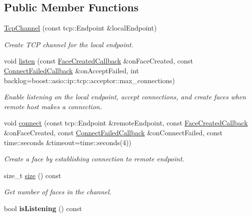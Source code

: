 \subsection*{Public Member Functions}
\begin{DoxyCompactItemize}
\item 
\hyperlink{classnfd_1_1TcpChannel_a3a7559bdecc4a76e08046ebc1f3c93c4}{Tcp\+Channel} (const tcp\+::\+Endpoint \&local\+Endpoint)
\begin{DoxyCompactList}\small\item\em Create T\+CP channel for the local endpoint. \end{DoxyCompactList}\item 
void \hyperlink{classnfd_1_1TcpChannel_ab2c06032e8775433fc01ce11937f7ca9}{listen} (const \hyperlink{classnfd_1_1Channel_a47f1a8874228ad9dfa38b4e96f6f8d57}{Face\+Created\+Callback} \&on\+Face\+Created, const \hyperlink{classnfd_1_1Channel_a090bac376b438fb150ce740c2839375b}{Connect\+Failed\+Callback} \&on\+Accept\+Failed, int backlog=boost\+::asio\+::ip\+::tcp\+::acceptor\+::max\+\_\+connections)
\begin{DoxyCompactList}\small\item\em Enable listening on the local endpoint, accept connections, and create faces when remote host makes a connection. \end{DoxyCompactList}\item 
void \hyperlink{classnfd_1_1TcpChannel_aecd445a7df92fd55daa14bb6059796f4}{connect} (const tcp\+::\+Endpoint \&remote\+Endpoint, const \hyperlink{classnfd_1_1Channel_a47f1a8874228ad9dfa38b4e96f6f8d57}{Face\+Created\+Callback} \&on\+Face\+Created, const \hyperlink{classnfd_1_1Channel_a090bac376b438fb150ce740c2839375b}{Connect\+Failed\+Callback} \&on\+Connect\+Failed, const time\+::seconds \&timeout=time\+::seconds(4))\hypertarget{classnfd_1_1TcpChannel_aecd445a7df92fd55daa14bb6059796f4}{}\label{classnfd_1_1TcpChannel_aecd445a7df92fd55daa14bb6059796f4}

\begin{DoxyCompactList}\small\item\em Create a face by establishing connection to remote endpoint. \end{DoxyCompactList}\item 
size\+\_\+t \hyperlink{classnfd_1_1TcpChannel_ad4d8610d64af2b03468357d29c2e9f92}{size} () const\hypertarget{classnfd_1_1TcpChannel_ad4d8610d64af2b03468357d29c2e9f92}{}\label{classnfd_1_1TcpChannel_ad4d8610d64af2b03468357d29c2e9f92}

\begin{DoxyCompactList}\small\item\em Get number of faces in the channel. \end{DoxyCompactList}\item 
bool {\bfseries is\+Listening} () const\hypertarget{classnfd_1_1TcpChannel_ab5a8445c69e2d2c1a8c2ad4c1c8f5cae}{}\label{classnfd_1_1TcpChannel_ab5a8445c69e2d2c1a8c2ad4c1c8f5cae}

\end{DoxyCompactItemize}
